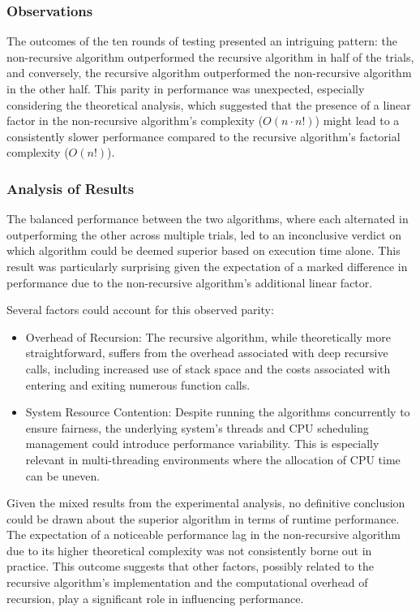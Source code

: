 \documentclass{article}
\begin{document}
\subsubsection*{Observations}

The outcomes of the ten rounds of testing presented an intriguing pattern: the non-recursive algorithm outperformed the recursive algorithm in half of the trials, and conversely, the recursive algorithm outperformed the non-recursive algorithm in the other half. This parity in performance was unexpected, especially considering the theoretical analysis, which suggested that the presence of a linear factor in the non-recursive algorithm's complexity ($O(n \cdot n!)$) might lead to a consistently slower performance compared to the recursive algorithm's factorial complexity ($O(n!)$).

\subsubsection*{Analysis of Results}

The balanced performance between the two algorithms, where each alternated in outperforming the other across multiple trials, led to an inconclusive verdict on which algorithm could be deemed superior based on execution time alone. This result was particularly surprising given the expectation of a marked difference in performance due to the non-recursive algorithm's additional linear factor.

Several factors could account for this observed parity:

\begin{itemize}
    \item Overhead of Recursion: The recursive algorithm, while theoretically more straightforward, suffers from the overhead associated with deep recursive calls, including increased use of stack space and the costs associated with entering and exiting numerous function calls.
    \item System Resource Contention: Despite running the algorithms concurrently to ensure fairness, the underlying system's threads and CPU scheduling management could introduce performance variability. This is especially relevant in multi-threading environments where the allocation of CPU time can be uneven.
\end{itemize}

Given the mixed results from the experimental analysis, no definitive conclusion could be drawn about the superior algorithm in terms of runtime performance. The expectation of a noticeable performance lag in the non-recursive algorithm due to its higher theoretical complexity was not consistently borne out in practice. This outcome suggests that other factors, possibly related to the recursive algorithm's implementation and the computational overhead of recursion, play a significant role in influencing performance.
\end{document}

